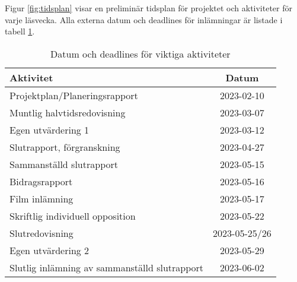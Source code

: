 Figur \ref{fig:tidsplan} visar en preliminär tidsplan för projektet och
aktiviteter för varje läsvecka. Alla externa datum och deadlines för inlämningar
är listade i tabell \ref{tab:deadlines}.


\begin{table}[h]
\caption{Datum och deadlines för viktiga aktiviteter}
\begin{center}
\begin{tabular}{| l | c |}
\hline
\bfseries{Aktivitet}                                 &  \bfseries{Datum} \\
\hline
Projektplan/Planeringsrapport                        &  2023-02-10\\
Muntlig halvtidsredovisning                          &  2023-03-07\\
Egen utvärdering 1                                   &  2023-03-12\\
Slutrapport, förgranskning                           &  2023-04-27\\
Sammanställd slutrapport                             &  2023-05-15\\
Bidragsrapport                                       &  2023-05-16\\
Film inlämning                                       &  2023-05-17\\
Skriftlig individuell opposition                     &  2023-05-22\\
Slutredovisning                                      &  2023-05-25/26\\
Egen utvärdering 2                                   &  2023-05-29\\
Slutlig inlämning av sammanställd slutrapport        &  2023-06-02\\
    \hline
\end{tabular}
\label{tab:deadlines}
\end{center}
\end{table}

